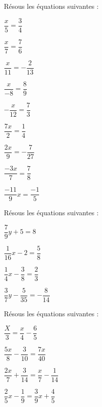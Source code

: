 \begin{exercice}[Équations du type $ax = b$]

Résous les équations suivantes :

\begin{colenumerate}{3} 
\item $\dfrac{x}{5} = \dfrac{3}{4}$
\item $\dfrac{x}{7} = \dfrac{7}{6}$
\item $\dfrac{x}{11} = -\dfrac{2}{13}$
\item $\dfrac{x}{-8} = \dfrac{8}{9}$
\item $-\dfrac{x}{12} = \dfrac{7}{3}$
\item $\dfrac{7x}{2} = \dfrac{1}{4}$
\item $\dfrac{2x}{9} = -\dfrac{7}{27}$
\item $\dfrac{-3x}{7} = \dfrac{7}{8}$
\item $\dfrac{-11}{9}x = \dfrac{-1}{5}$
\end{colenumerate} 
\end{exercice}

\begin{exercice}[Équations du type $ax + b = c$]

Résous les équations suivantes :

\begin{colenumerate}{2} 
\item $\dfrac{7}{9} y + 5 = 8$
\item $\dfrac{1}{16} x - 2 = \dfrac{5}{8}$
\item $\dfrac{1}{4} x - \dfrac{3}{8} = \dfrac{2}{3}$
\item $\dfrac{3}{7} y - \dfrac{5}{35} = -\dfrac{8}{14}$
\end{colenumerate} 
\end{exercice}

\begin{exercice}

Résous les équations suivantes :

\begin{colenumerate}{2} 
\item $\dfrac{X}{3} = \dfrac{x}{4} - \dfrac{6}{5}$
\item $\dfrac{5x}{8} - \dfrac{3}{10} = \dfrac{7x}{40}$
\item $\dfrac{2x}{7} + \dfrac{3}{14} = \dfrac{x}{7} - \dfrac{1}{14}$
\item $\dfrac{2}{5} x - \dfrac{1}{9} = \dfrac{3}{9} x + \dfrac{4}{5}$
\end{colenumerate} 
\end{exercice}






